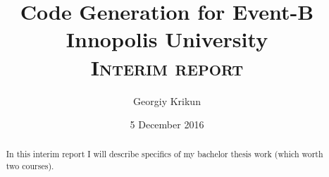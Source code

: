 \documentclass[12pt]{article}
\title{
	{Code Generation for Event-B}\\
	{\large Innopolis University}\\
	{\large \textsc{Interim report}}\\
}
\author{Georgiy Krikun}
\date{5 December 2016}
\begin{document}
\setcounter{secnumdepth}{0}

\maketitle
\pagebreak
\begin{abstract}
  In this interim report I will describe specifics of my bachelor thesis work
  (which worth two courses).
\end{abstract}

\pagebreak
\tableofcontents











\end{document}
